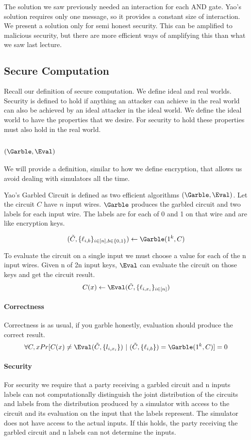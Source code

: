 The solution we saw previously needed an interaction for each AND gate.
Yao's solution requires only one message,
so it provides a constant size of interaction.
We present a solution only for semi honest security. 
This can be amplified to malicious security, 
but there are more efficient ways of amplifying this than what we saw last lecture.

\subsection{Secure Computation}

Recall our definition of secure computation. 
We define ideal and real worlds. 
Security is defined to hold if 
anything an attacker can achieve in the real world 
 can also be achieved by an ideal attacker in the ideal world. 
We define the ideal world to have the properties that we desire. 
For security to hold these properties must also hold in the real world.

\subsection{$(\Garble, \Eval)$}
We will provide a definition, similar to how we define encryption, that allows us avoid dealing with simulators all the time. 


Yao's Garbled Circuit is defined as two efficient algorithms $(\Garble, \Eval)$. Let the circuit $C$ have $n$ input wires.
$\Garble$ produces the garbled circuit and two labels for each input wire. The labels are for each of 0 and 1 on that wire and are like encryption keys. 

\[
(\tilde{C}, \{\ell_{i,b}\}_{i \in [n], b \in \{0,1\}}) \leftarrow \Garble(1^k, C) 
\]

To evaluate the circuit on a single input we must choose a value for each of the n input wires.
Given n of 2n input keys, $\Eval$ can evaluate the circuit on those keys and get the circuit result.
\[
C(x) \leftarrow \Eval(\tilde{C}, \{\ell_{i, x_i}\}_{i \in [n]}) 
\]

\paragraph{Correctness}
Correctness is as usual, if you garble honestly, evaluation should produce the correct result. 
\[
\forall C, x 
Pr[ C(x) \ne \Eval(\tilde{C}, \{l_{i, x_i}\})\ |\ (\tilde{C}, \{\ell_{i,b}\}) = \Garble(1^k, C)] = 0
\]


\paragraph{Security}
For security we require that a party receiving 
a garbled circuit and n inputs labels 
can not computationally distinguish the joint distribution of the circuits and labels
from the distribution produced by 
a simulator with access to the circuit and its evaluation on the input that the labels represent. 
The simulator does not have access to the actual inputs.
If this holds, the party receiving the garbled circuit and n labels can not determine the inputs.

